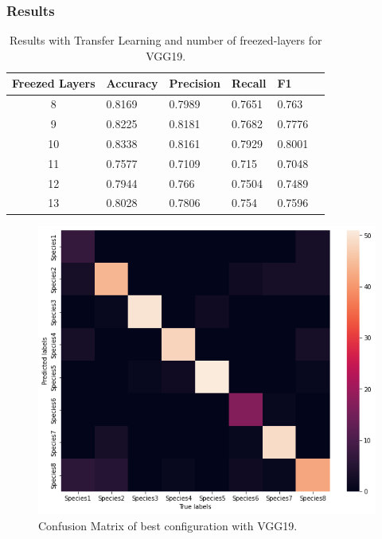 \documentclass[10pt]{article}
\begin{document}
\subsubsection{Results}
\begin{table}[ht]
\centering
\begin{adjustbox}{width=240}
\small
\begin{tabular}{|c|l|l|l|l|l}

\hline \bf Freezed Layers & \bf Accuracy & \bf Precision & \bf Recall & \bf F1 \\ \hline
8 & 0.8169 & 0.7989 & 0.7651 & 0.763\\
9 & 0.8225 & 0.8181 & 0.7682 & 0.7776\\
10 & 0.8338 & 0.8161 & 0.7929 & 0.8001\\
11 & 0.7577 & 0.7109 & 0.715 & 0.7048\\
12 & 0.7944 & 0.766 & 0.7504 & 0.7489\\
13 & 0.8028 & 0.7806 & 0.754 & 0.7596\\
\hline
\end{tabular}
\end{adjustbox}
\caption{Results with Transfer Learning and number of freezed-layers for VGG19.}
\label{vgg19_results}
\end{table}


\begin{figure}[ht]
\begin{center}
\centerline{\includegraphics[width=\columnwidth]{VGG19_best}}
\caption{Confusion Matrix of best configuration with VGG19.}
\label{bayespic}
\end{center}
\end{figure}
\end{document}
